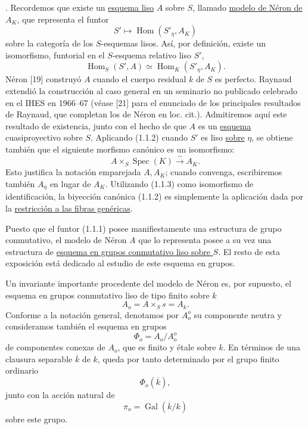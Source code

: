 \medskip
{}. Recordemos que existe un \underline{esquema liso} $A$ sobre $S$,
llamado \underline{modelo de Néron de $A_K$}, que representa el funtor
\begin{equation}\tag{1.1.1}
 S'\longmapsto\operatorname{Hom}(S'_\eta,A_K)
\end{equation}
sobre la categoría de los $S$-esquemas lisos. Así, por definición,
existe un isomorfismo, funtorial en el $S$-esquema relativo liso $S'$,
\begin{equation}\tag{1.1.2}
 \operatorname{Hom}_S(S',A)\simeq
 \operatorname{Hom}_K(S'_\eta,A_K).
\end{equation}
Néron [19] construyó $A$ cuando el cuerpo residual $k$ de $S$ es
perfecto. Raynaud extendió la construcción al caso general en un
seminario no publicado celebrado en el IHES en 1966--67 (véase [21]
para el enunciado de los principales resultados de Raynaud, que
completan los de Néron en loc. cit.). Admitiremos aquí este resultado
de existencia, junto con el hecho de que $A$ es un \underline{esquema}
cuasiproyectivo sobre $S$. Aplicando (1.1.2) cuando $S'$ es liso
\underline{sobre} $\eta$, se obtiene también que el siguiente
morfismo canónico es un isomorfismo:
\begin{equation}\tag{1.1.3}
 A\times_S\operatorname{Spec}(K)\xrightarrow{\ \sim\ }A_K.
\end{equation}
Esto justifica la notación emparejada $A,A_K$; cuando convenga,
escribiremos también $A_\eta$ en lugar de $A_K$. Utilizando (1.1.3)
como isomorfismo de identificación, la biyección canónica (1.1.2) es
simplemente la aplicación dada por la \underline{restricción a las
fibras genéricas}.

Puesto que el funtor (1.1.1) posee manifiestamente una estructura de
grupo conmutativo, el modelo de Néron $A$ que lo representa posee a su
vez una estructura de \underline{esquema en grupos conmutativo liso
sobre $S$}. El resto de esta exposición está dedicado al estudio de
este esquema en grupos.

Un invariante importante procedente del modelo de Néron es, por
supuesto, el esquema en grupos conmutativo liso de tipo finito sobre
$k$
\begin{equation}\tag{1.1.4}
 A_o=A\times_Ss=A_k.
\end{equation}
Conforme a la notación general, denotamos por $A_o^o$ su componente
neutra y consideramos también el esquema en grupos
\begin{equation}\tag{1.1.5}
 \Phi_o=A_o/A_o^o
\end{equation}
de componentes conexas de $A_o$, que es finito y étale sobre $k$. En
términos de una clausura separable $\overline k$ de $k$, queda por tanto
determinado por el grupo finito ordinario
\begin{equation}\tag{1.1.6}
 \Phi_o(\overline k),
\end{equation}
junto con la acción natural de
\[
 \pi_o=\operatorname{Gal}(\overline k/k)
\]
sobre este grupo.

